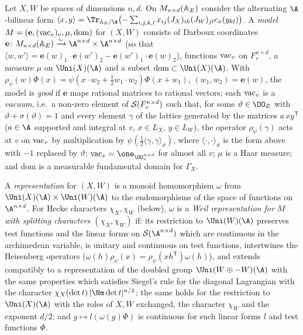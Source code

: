 \begin{definition}\label{pf:thmK:def:models}
Let $X,W$ be spaces of dimensions $n,d$. On $M_{n\times d}(\mathbb{A}_E)$ consider the alternating $\A$-bilinear form
$\langle x,y\rangle=\Tr_{\thmKAE/\A}\bigl(-\sum_{i,j,k,l}x_{ij}(J_X)_{ik}(J_W)_{jl}c_\sigma(y_{kl})\bigr)$. A \emph{model}
$M=(\mathbf e,(\mathrm{vac}_v)_v,\mu,\mathrm{dom})$ for $(X,W)$ consists of Darboux coordinates
$\mathbf e\colon M_{n\times d}(\thmKAE)\xrightarrow{\sim}\A^{n\times d}\times\A^{n\times d}$ (so that $\langle w,w'\rangle
=\mathbf e(w)_1\cdot\mathbf e(w')_2-\mathbf e(w')_1\cdot\mathbf e(w)_2$), functions $\mathrm{vac}_v$ on $F_v^{n\times d}$, a
measure $\mu$ on $\Uni(X)(\A)$ and a subset $\mathrm{dom}\subset\Uni(X)(\A)$. With
$\rho_\psi(w)\Phi(x)=\psi(x\cdot w_2+\tfrac12w_1\cdot w_2)\Phi(x+w_1)$, $(w_1,w_2)=\mathbf e(w)$, the model is
\emph{good} if $\mathbf e$ maps rational matrices to rational vectors; each $\mathrm{vac}_v$ is a \emph{vacuum}, i.e.\ a
non-zero element of $\mathcal{S}(F_v^{n\times d})$ such that, for some $\vartheta\in\OO_E$ with $\vartheta+\sigma(\vartheta)=1$
and every element $\gamma$ of the lattice generated by the matrices $a\,xy^{\mathsf T}$ ($a\in\A$ supported and integral at
$v$, $x\in L_X$, $y\in L_W$), the operator $\rho_\psi(\gamma)$ acts at $v$ on $\mathrm{vac}_v$ by multiplication by
$\psi(\tfrac12\langle\gamma,\gamma\rangle_\vartheta)$, where $\langle\cdot,\cdot\rangle_\vartheta$ is the form above with $-1$
replaced by $\vartheta$; $\thmKvac_v=\one_{\OO_v^{n\times
d}}$ for almost all $v$; $\mu$ is a Haar measure; and $\mathrm{dom}$ is a measurable fundamental domain for $\Gamma_X$.

A \emph{representation} for $(X,W)$ is a monoid homomorphism $\omega$ from $\Uni(X)(\A)\times\Uni(W)(\A)$ to the
endomorphisms of the space of functions on $\A^{n\times d}$. For Hecke characters $\chi_X,\chi_W$ (below), $\omega$ is a
\emph{Weil representation for $M$ with splitting characters $(\chi_X,\chi_W)$} if: its restriction to $\Uni(W)(\A)$
preserves test functions and the linear forms on $\thmKS(\A^{n\times d})$ which are continuous in the archimedean
variable, is unitary and continuous on test functions, intertwines the Heisenberg operators
($\omega(h)\rho_\psi(x)=\rho_\psi(xh^{\mathsf T})\omega(h)$), and extends compatibly to a representation of the doubled
group $\Uni(W\oplus-W)(\A)$ with the same properties which satisfies Siegel's rule for the diagonal Lagrangian with the
character $\chi_X(\det t)\,|\Nm\det t|^{n/2}$; the same holds for the restriction to $\Uni(X)(\A)$ with the roles of
$X,W$ exchanged, the character $\chi_W$ and the exponent $d/2$; and $g\mapsto l(\omega(g)\Phi)$ is continuous for such
linear forms $l$ and test functions $\Phi$.


\end{definition}
